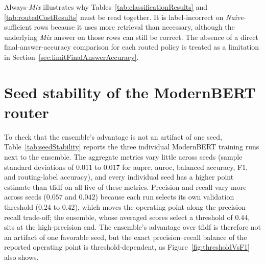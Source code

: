 \documentclass[english, bibtex]{kththesis}               %
\numberwithin{listing}{chapter}
\begin{document}
Always-\emph{Mix} illustrates why Tables~\ref{tab:classificationResults} and \ref{tab:routedCostResults} must be read together. It is label-incorrect on \emph{Naive}-sufficient rows because it uses more retrieval than necessary, although the underlying \emph{Mix} answer on those rows can still be correct. The absence of a direct final-answer-accuracy comparison for each routed policy is treated as a limitation in Section~\ref{sec:limitFinalAnswerAccuracy}.

\section{Seed stability of the ModernBERT router}
\label{sec:resultsSeeds}

To check that the ensemble's advantage is not an artifact of one seed, Table~\ref{tab:seedStability} reports the three individual ModernBERT training runs next to the ensemble. The aggregate metrics vary little across seeds (sample standard deviations of $0.011$ to $0.017$ for \gls{auprc}, \gls{auroc}, balanced accuracy, F1, and routing-label accuracy), and every individual seed has a higher point estimate than \gls{tfidf} on all five of these metrics. Precision and recall vary more across seeds ($0.057$ and $0.042$) because each run selects its own validation threshold ($0.24$ to $0.42$), which moves the operating point along the precision--recall trade-off; the ensemble, whose averaged scores select a threshold of $0.44$, sits at the high-precision end. The ensemble's advantage over \gls{tfidf} is therefore not an artifact of one favorable seed, but the exact precision--recall balance of the reported operating point is threshold-dependent, as Figure~\ref{fig:thresholdVsF1} also shows.
\end{document}
